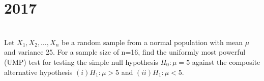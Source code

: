 \section*{2017}
\vspace{-.5cm}
\hrulefill \smallskip\\
 Let $X_1,X_2,\ldots,X_n$ be a random sample from a normal population with mean $\mu$ and variance 25. For a sample size of n=16, find the uniformly most powerful (UMP) test for testing the simple null hypothesis $H_0 : \mu =5$ against the composite alternative hypothesis $(i)H_1: \mu > 5$ and $(ii)H_1: \mu < 5$.